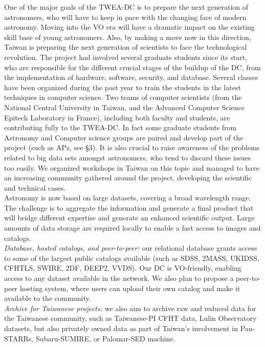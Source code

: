 One of the major goals of the TWEA-DC is to prepare the next generation of astronomers, who will have to keep in pace with the changing face of modern astronomy. Moving into the VO era will have a dramatic impact on the existing skill base of young astronomers. Also, by making a move now in this direction, Taiwan is preparing the next generation of scientists to face the technological revolution. The project had involved several graduate students since its start, who are responsible for the different crucial stages of the buildup of the DC, from the implementation of hardware, software, security, and database. Several classes have been organized during the past year to train the students in the latest techniques in computer science. Two teams of computer scientists (from the National Central University in Taiwan, and the Advanced Computer Science Epitech Laboratory in France), including both faculty and students, are contributing fully to the TWEA-DC. In fact some graduate students from Astronomy and Computer science groups are paired and develop part of the project (such as APz, see \S 3). It is also crucial to raise awareness of the problems related to big data sets amongst astronomers, who tend to discard these issues too easily. We organized workshops in Taiwan on this topic and managed to have an increasing community gathered around the project, developing the scientific and technical cases.\\

Astronomy is now based on large datasets, covering a broad wavelength range. The challenge is to aggregate the information and generate a final product that will bridge different expertise and generate an enhanced scientific output. Large amounts of data storage are required locally to enable a fast access to images and catalogs.  \\ 
{\it Database, hosted catalogs, and peer-to-peer:} our relational database grants access to some of the largest public catalogs available (such as SDSS, 2MASS, UKIDSS, CFHTLS, SWIRE, 2DF, DEEP2, VVDS). Our DC is VO-friendly, enabling access to any dataset available in the network. We also plan to propose a peer-to-peer hosting system, where users can upload their own catalog and make it available to the community.\\
{\it Archive for Taiwanese projects:} we also aim to archive raw and reduced data for the Taiwanese community, such as Taiwanese-PI CFHT data, Lulin Observatory datasets, but also privately owned data as part of Taiwan's involvement in Pan-STARRs, Subaru-SUMIRE, or Palomar-SED machine.\\

